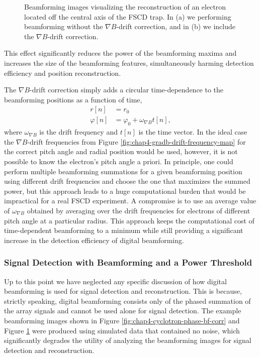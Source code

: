 \begin{figure}[htbp]
\begin{subfigure}{0.45\textwidth}
        \caption{}
    \end{subfigure}
    \caption{Beamforming images visualizing the reconstruction of an electron located off the central axis of the FSCD trap. In (a) we performing beamforming without the $\nabla B$-drift correction, and in (b) we include the $\nabla B$-drift correction.}
    \label{fig:chap4-gradb-bf-drift-corr}
\end{figure}
This effect significantly reduces the power of the beamforming maxima and increases the size of the beamforming features, simultaneously harming detection efficiency and position reconstruction. 

The $\nabla B$-drift correction simply adds a circular time-dependence to the beamforming positions as a function of time,
\begin{align}
    r[n]&=r_0\\
    \varphi[n]&=\varphi_0 + \omega_{\nabla B}t[n], 
\end{align}
where $\omega_{\nabla B}$ is the drift frequency and $t[n]$ is the time vector. In the ideal case the $\nabla B$-drift frequencies from Figure \ref{fig:chap4-gradb-drift-frequency-map} for the correct pitch angle and radial position would be used, however, it is not possible to know the electron's pitch angle a priori. In principle, one could perform multiple beamforming summations for a given beamforming position using different drift frequencies and choose the one that maximizes the summed power, but this approach leads to a huge computational burden that would be impractical for a real FSCD experiment. A compromise is to use an average value of $\omega_{\nabla B}$ obtained by averaging over the drift frequencies for electrons of different pitch angle at a particular radius. This approach keeps the computational cost of time-dependent beamforming to a minimum while still providing a significant increase in the detection efficiency of digital beamforming.

\subsubsection*{Signal Detection with Beamforming and a Power Threshold}

Up to this point we have neglected any specific discussion of how digital beamforming is used for signal detection and reconstruction. This is because, strictly speaking, digital beamforming consists only of the phased summation of the array signals and cannot be used alone for signal detection. The example beamforming images shown in Figure \ref{fig:chap4-cyclotron-phase-bf-corr} and Figure \ref{fig:chap4-gradb-bf-drift-corr} were produced using simulated data that contained no noise, which significantly degrades the utility of analyzing the beamforming images for signal detection and reconstruction. 

